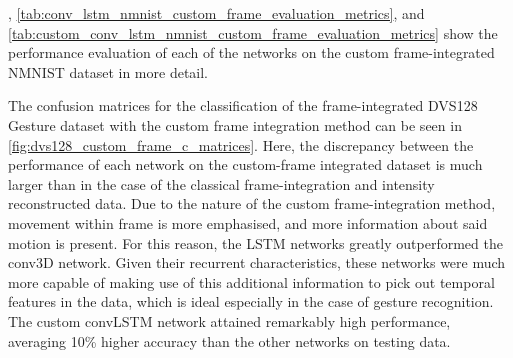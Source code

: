 , \cref{tab:conv_lstm_nmnist_custom_frame_evaluation_metrics}, and \cref{tab:custom_conv_lstm_nmnist_custom_frame_evaluation_metrics} show the performance evaluation of each of the networks on the custom frame-integrated NMNIST dataset in more detail.

\vspace{10pt}

The confusion matrices for the classification of the frame-integrated DVS128 Gesture dataset with the custom frame integration method can be seen in \cref{fig:dvs128_custom_frame_c_matrices}. Here, the discrepancy between the performance of each network on the custom-frame integrated dataset is much larger than in the case of the classical frame-integration and intensity reconstructed data. Due to the nature of the custom frame-integration method, movement within frame is more emphasised, and more information about said motion is present. For this reason, the LSTM networks greatly outperformed the conv3D network. Given their recurrent characteristics, these networks were much more capable of making use of this additional information to pick out temporal features in the data, which is ideal especially in the case of gesture recognition. The custom convLSTM network attained remarkably high performance, averaging 10\% higher accuracy than the other networks on testing data.

